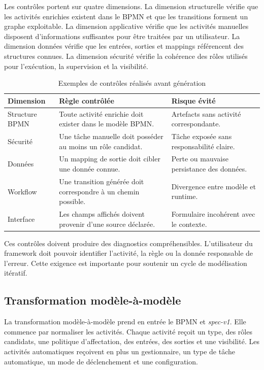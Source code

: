 Les contrôles portent sur quatre dimensions. La dimension structurelle vérifie que les activités enrichies existent dans le BPMN et que les transitions forment un graphe exploitable. La dimension applicative vérifie que les activités manuelles disposent d'informations suffisantes pour être traitées par un utilisateur. La dimension données vérifie que les entrées, sorties et mappings référencent des structures connues. La dimension sécurité vérifie la cohérence des rôles utilisés pour l'exécution, la supervision et la visibilité.

\begin{table}[H]
\centering
\small
\caption{Exemples de contrôles réalisés avant génération}
\label{tab:chap3-controles-generation}
\begin{tabular}{p{3.8cm}p{5.2cm}p{4.8cm}}
\hline
\textbf{Dimension} & \textbf{Règle contrôlée} & \textbf{Risque évité} \\
\hline
Structure BPMN & Toute activité enrichie doit exister dans le modèle BPMN. & Artefacts sans activité correspondante. \\
Sécurité & Une tâche manuelle doit posséder au moins un rôle candidat. & Tâche exposée sans responsabilité claire. \\
Données & Un mapping de sortie doit cibler une donnée connue. & Perte ou mauvaise persistance des données. \\
Workflow & Une transition générée doit correspondre à un chemin possible. & Divergence entre modèle et runtime. \\
Interface & Les champs affichés doivent provenir d'une source déclarée. & Formulaire incohérent avec le contexte. \\
\hline
\end{tabular}
\end{table}

Ces contrôles doivent produire des diagnostics compréhensibles. L'utilisateur du framework doit pouvoir identifier l'activité, la règle ou la donnée responsable de l'erreur. Cette exigence est importante pour soutenir un cycle de modélisation itératif.

\subsection{Transformation modèle-à-modèle}

La transformation modèle-à-modèle prend en entrée le BPMN et \textit{spec-v1}. Elle commence par normaliser les activités. Chaque activité reçoit un type, des rôles candidats, une politique d'affectation, des entrées, des sorties et une visibilité. Les activités automatiques reçoivent en plus un gestionnaire, un type de tâche automatique, un mode de déclenchement et une configuration.

